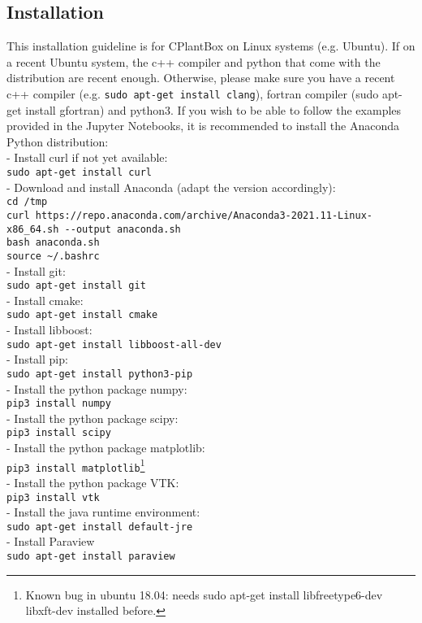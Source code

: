 \newpage
\subsection{Installation}

This installation guideline is for CPlantBox on Linux systems (e.g. Ubuntu). 
If on a recent Ubuntu system, the c++ compiler and python that come with the distribution are recent enough. Otherwise, please make sure you have a recent c++ compiler (e.g. \lstinline{sudo apt-get install clang}), fortran compiler (sudo apt-get install gfortran) and python3. If you wish to be able to follow the examples provided in the Jupyter Notebooks, it is recommended to install the Anaconda Python distribution: \\
- Install curl if not yet available:\\
\lstinline{sudo apt-get install curl}\\
- Download and install Anaconda (adapt the version accordingly):\\
\lstinline{cd /tmp}\\
\lstinline{curl https://repo.anaconda.com/archive/Anaconda3-2021.11-Linux-x86_64.sh --output anaconda.sh} \\
\lstinline{bash anaconda.sh}\\
\lstinline{source ~/.bashrc}\\

- Install git: \\
\lstinline{sudo apt-get install git}\\
- Install cmake:\\
\lstinline{sudo apt-get install cmake}\\
- Install libboost:\\
\lstinline{sudo apt-get install libboost-all-dev}\\
- Install pip:\\
\lstinline{sudo apt-get install python3-pip}\\
- Install the python package numpy:\\
\lstinline{pip3 install numpy}\\
- Install the python package scipy:\\
\lstinline{pip3 install scipy}\\
- Install the python package matplotlib:\\
\lstinline{pip3 install matplotlib}\footnote{Known bug in ubuntu 18.04: needs sudo apt-get install libfreetype6-dev libxft-dev installed before.}\\
- Install the python package VTK:\\
\lstinline {pip3 install vtk}\\
- Install the java runtime environment:\\
\lstinline{sudo apt-get install default-jre}\\
- Install Paraview\\
\lstinline{sudo apt-get install paraview}\\


